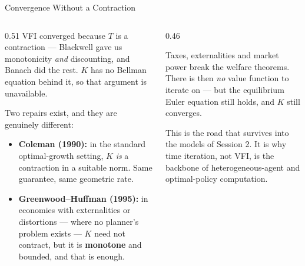 \begin{frame}{Convergence Without a Contraction}
\begin{columns}[T]
\begin{column}{0.51\textwidth}
\small
VFI converged because $T$ is a contraction --- Blackwell gave us monotonicity \emph{and} discounting, and Banach did the rest. $K$ has no Bellman equation behind it, so that argument is unavailable.
\medskip

Two repairs exist, and they are genuinely different:
\medskip
\begin{itemize}\footnotesize
  \item \textbf{Coleman (1990):} in the standard optimal-growth setting, $K$ \emph{is} a contraction in a suitable norm. Same guarantee, same geometric rate.
  \item \textbf{Greenwood--Huffman (1995):} in economies with externalities or distortions --- where no planner's problem exists --- $K$ need not contract, but it is \textbf{monotone} and bounded, and that is enough.
\end{itemize}
\end{column}
\begin{column}{0.46\textwidth}
\begin{conceptbox}[title=\textbf{Why the second one matters}]\small
Taxes, externalities and market power break the welfare theorems. There is then \emph{no} value function to iterate on --- but the equilibrium Euler equation still holds, and $K$ still converges.
\end{conceptbox}
\medskip
\begin{takeawaybox}\footnotesize
This is the road that survives into the models of Session 2. It is why time iteration, not VFI, is the backbone of heterogeneous-agent and optimal-policy computation.
\end{takeawaybox}
\end{column}
\end{columns}
\vspace{1mm}
\end{frame}

